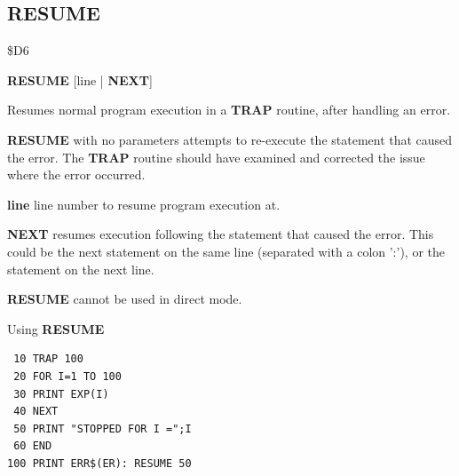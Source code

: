 
\newpage
\subsection{RESUME}
\begin{description}[leftmargin=2cm,style=nextline]
\item [Token:] \$D6
\item [Format:] {\bf RESUME} [line | {\bf NEXT}]
\item [Usage:]  Resumes normal program execution in a {\bf TRAP} routine,
                after handling an error.

                {\bf RESUME} with no parameters attempts to
                re-execute the statement that caused the error.
                The {\bf TRAP} routine should have examined
                and corrected the issue where the error occurred.

                {\bf line} line number to resume program execution at.

                {\bf NEXT} resumes execution following the statement that caused
                the error. This could be the next statement on the same line
                (separated with a colon ':'), or the statement on the next line.

\item [Remarks:] {\bf RESUME} cannot be used in direct mode.
\item [Example:] Using {\bf RESUME}

\begin{tcolorbox}[colback=black,coltext=white]
\verbatimfont{\codefont}
\begin{verbatim}
 10 TRAP 100
 20 FOR I=1 TO 100
 30 PRINT EXP(I)
 40 NEXT
 50 PRINT "STOPPED FOR I =";I
 60 END
100 PRINT ERR$(ER): RESUME 50
\end{verbatim}
\end{tcolorbox}
\end{description}


\newpage
